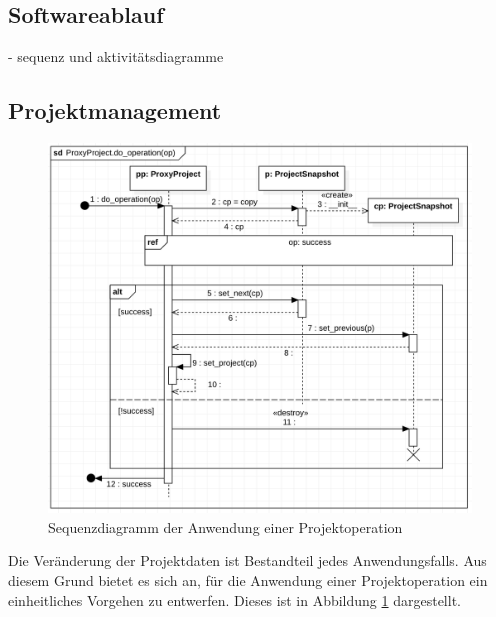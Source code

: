 \documentclass{article}
\begin{document}
\begin{itemize}
\newpage
\section{Softwareablauf}
- sequenz und aktivitätsdiagramme
\subsection{Projektmanagement}
\begin{figure}[H]%
    \centering
    \includegraphics[width=13cm]{entwurf/Entwurf_dokument/img/Michael/sd_ProxyProject.do_operation.png}
    \caption{Sequenzdiagramm der Anwendung einer Projektoperation}
    \label{fig:sq:do_operation}
\end{figure}

Die Veränderung der Projektdaten ist Bestandteil jedes Anwendungsfalls. Aus diesem Grund bietet es sich an, für die Anwendung einer Projektoperation ein einheitliches Vorgehen zu entwerfen. Dieses ist in Abbildung \ref{fig:sq:do_operation} dargestellt.\\


\end{itemize}
\end{document}
